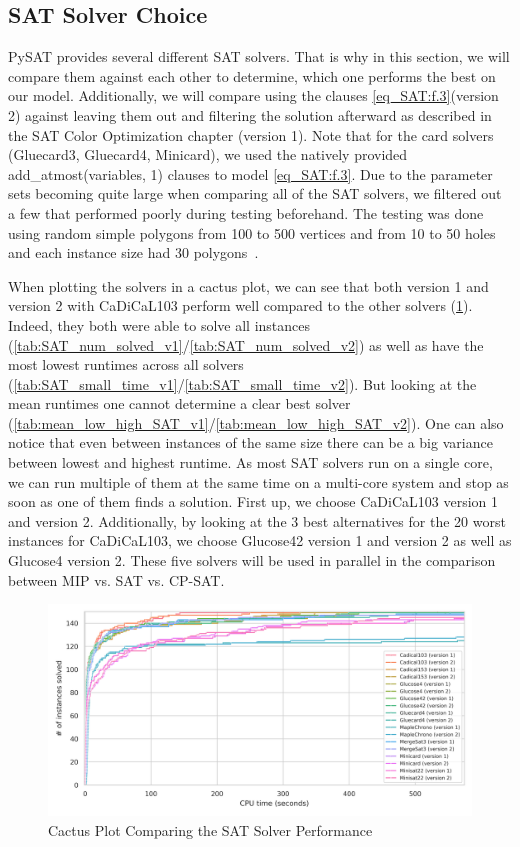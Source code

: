 \subsection{SAT Solver Choice}
PySAT provides several different SAT solvers. That is why in this section, we will compare them against each other to determine, which one performs the best on our model. Additionally, we will compare using the clauses \cref{eq_SAT:f.3}(version 2) against leaving them out and filtering the solution afterward as described in the SAT Color Optimization chapter (version 1). Note that for the card solvers (Gluecard3, Gluecard4, Minicard), we used the natively provided add\_atmost(variables, 1) clauses to model \cref{eq_SAT:f.3}. Due to the parameter sets becoming quite large when comparing all of the SAT solvers, we filtered out a few that performed poorly during testing beforehand. The testing was done using random simple polygons from 100 to 500 vertices and from 10 to 50 holes and each instance size had 30 polygons~\cite{wireless-localization-instances-page}.\par\noindent 
When plotting the solvers in a cactus plot, we can see that both version 1 and version 2 with CaDiCaL103 perform well compared to the other solvers (\cref{fig:cactus_SAT}). Indeed, they both were able to solve all instances (\cref{tab:SAT_num_solved_v1}/\cref{tab:SAT_num_solved_v2}) as well as have the most lowest runtimes across all solvers (\cref{tab:SAT_small_time_v1}/\cref{tab:SAT_small_time_v2}). But looking at the mean runtimes one cannot determine a clear best solver (\cref{tab:mean_low_high_SAT_v1}/\cref{tab:mean_low_high_SAT_v2}). One can also notice that even between instances of the same size there can be a big variance between lowest and highest runtime. As most SAT solvers run on a single core, we can run multiple of them at the same time on a multi-core system and stop as soon as one of them finds a solution. First up, we choose CaDiCaL103 version 1 and version 2. Additionally, by looking at the 3 best alternatives for the 20 worst instances for CaDiCaL103, we choose Glucose42 version 1 and version 2 as well as Glucose4 version 2. These five solvers will be used in parallel in the comparison between MIP vs. SAT vs. CP-SAT.

\begin{figure}[htbp]
\centering
\includegraphics[scale=0.7]{Thesis/figures/minibenchmark_cactus_plot_runtime_SAT_with_holes.png}
\caption{Cactus Plot Comparing the SAT Solver Performance}
\label{fig:cactus_SAT}
\end{figure}


